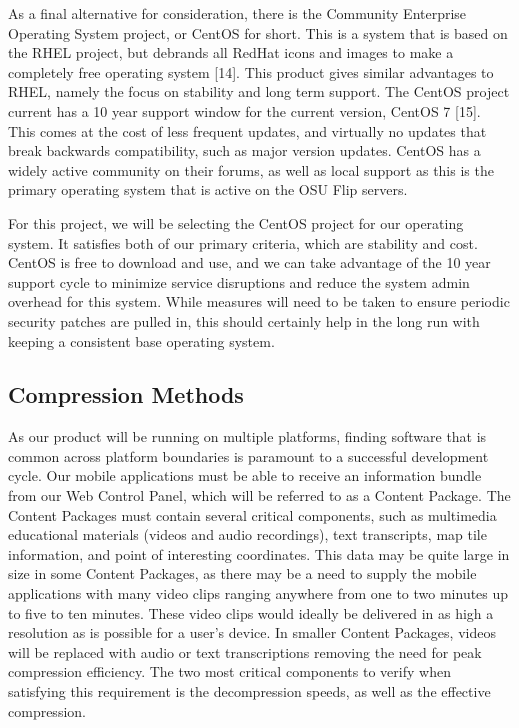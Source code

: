 \documentclass[letterpaper, 10pt,titlepage]{article}
\begin{document}
As a final alternative for consideration, there is the Community Enterprise Operating System project, or CentOS for short. This is a system that is based on the RHEL project, but debrands all RedHat icons and images to make a completely free operating system [14]. This product gives similar advantages to RHEL, namely the focus on stability and long term support. The CentOS project current has a 10 year support window for the current version, CentOS 7 [15]. This comes at the cost of less frequent updates, and virtually no updates that break backwards compatibility, such as major version updates. CentOS has a widely active community on their forums, as well as local support as this is the primary operating system that is active on the OSU Flip servers.


For this project, we will be selecting the CentOS project for our operating system. It satisfies both of our primary criteria, which are stability and cost. CentOS is free to download and use, and we can take advantage of the 10 year support cycle to minimize service disruptions and reduce the system admin overhead for this system. While measures will need to be taken to ensure periodic security patches are pulled in, this should certainly help in the long run with keeping a consistent base operating system.




\subsection{Compression Methods}
As our product will be running on multiple platforms, finding software that is common across platform boundaries is paramount to a successful development cycle. Our mobile applications must be able to receive an information bundle from our Web Control Panel, which will be referred to as a Content Package. The Content Packages must contain several critical components, such as multimedia educational materials (videos and audio recordings), text transcripts, map tile information, and point of interesting coordinates. This data may be quite large in size in some Content Packages, as there may be a need to supply the mobile applications with many video clips ranging anywhere from one to two minutes up to five to ten minutes. These video clips would ideally be delivered in as high a resolution as is possible for a user's device. In smaller Content Packages, videos will be replaced with audio or text transcriptions removing the need for peak compression efficiency. The two most critical components to verify when satisfying this requirement is the decompression speeds, as well as the effective compression.
\end{document}
